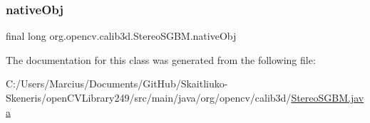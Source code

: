\subsubsection{\texorpdfstring{native\+Obj}{nativeObj}}
{\footnotesize\ttfamily final long org.\+opencv.\+calib3d.\+Stereo\+S\+G\+B\+M.\+native\+Obj\hspace{0.3cm}{\ttfamily [protected]}}



The documentation for this class was generated from the following file\+:\begin{DoxyCompactItemize}
\item 
C\+:/\+Users/\+Marcius/\+Documents/\+Git\+Hub/\+Skaitliuko-\/\+Skeneris/open\+C\+V\+Library249/src/main/java/org/opencv/calib3d/\mbox{\hyperlink{_stereo_s_g_b_m_8java}{Stereo\+S\+G\+B\+M.\+java}}\end{DoxyCompactItemize}
